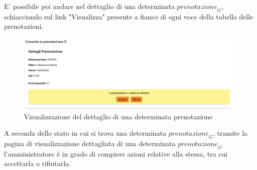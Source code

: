 E' possibile poi andare nel dettaglio di una determinata $\textit{prenotazione}_G$, schiacciando sul link "Visualizza" presente a fianco di ogni voce della tabella delle prenotazioni. 
\begin{figure}[H]
    \centering
    \includegraphics[width=0.6\linewidth]{img/dettaglio_prenotazione_admin.png}
    \caption{Visualizzazione del dettaglio di una determinata prenotazione}
\end{figure}
A seconda dello stato in cui si trova una determinata $\textit{prenotazione}_G$, tramite la pagina di visualizzazione dettagliata di una determinata $\textit{prenotazione}_G$ l'amministratore è in grado di compiere azioni relative alla stessa, tra cui accettarla o rifiutarla. 

